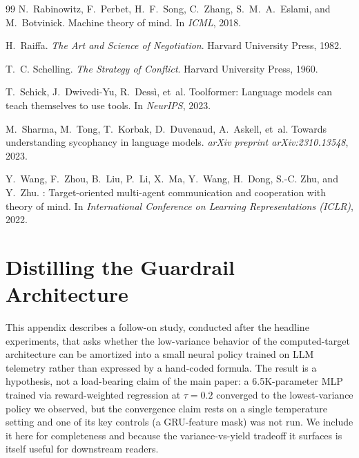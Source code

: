 \documentclass[11pt,a4paper]{article}
\begin{document}
\begin{thebibliography}{99}
N.~Rabinowitz, F.~Perbet, H.~F.~Song, C.~Zhang, S.~M.~A.~Eslami, and M.~Botvinick.
\newblock Machine theory of mind.
\newblock In \emph{ICML}, 2018.

H.~Raiffa.
\newblock \emph{The Art and Science of Negotiation}.
\newblock Harvard University Press, 1982.

T.~C. Schelling.
\newblock \emph{The Strategy of Conflict}.
\newblock Harvard University Press, 1960.

T.~Schick, J.~Dwivedi-Yu, R.~Dess{\`i}, et~al.
\newblock Toolformer: Language models can teach themselves to use tools.
\newblock In \emph{NeurIPS}, 2023.

M.~Sharma, M.~Tong, T.~Korbak, D.~Duvenaud, A.~Askell, et~al.
\newblock Towards understanding sycophancy in language models.
\newblock \emph{arXiv preprint arXiv:2310.13548}, 2023.

Y.~Wang, F.~Zhou, B.~Liu, P.~Li, X.~Ma, Y.~Wang, H.~Dong, S.-C. Zhu, and Y.~Zhu.
: Target-oriented multi-agent communication and cooperation with theory of mind.
\newblock In \emph{International Conference on Learning Representations (ICLR)}, 2022.

\end{thebibliography}
\endgroup

\appendix

\section{Distilling the Guardrail Architecture}
\label{sec:policy}

This appendix describes a follow-on study, conducted after the headline experiments, that asks whether the low-variance behavior of the computed-target architecture can be amortized into a small neural policy trained on LLM telemetry rather than expressed by a hand-coded formula. The result is a hypothesis, not a load-bearing claim of the main paper: a 6.5K-parameter MLP trained via reward-weighted regression at $\tau\!=\!0.2$ converged to the lowest-variance policy we observed, but the convergence claim rests on a single temperature setting and one of its key controls (a GRU-feature mask) was not run. We include it here for completeness and because the variance-vs-yield tradeoff it surfaces is itself useful for downstream readers.
\end{document}
